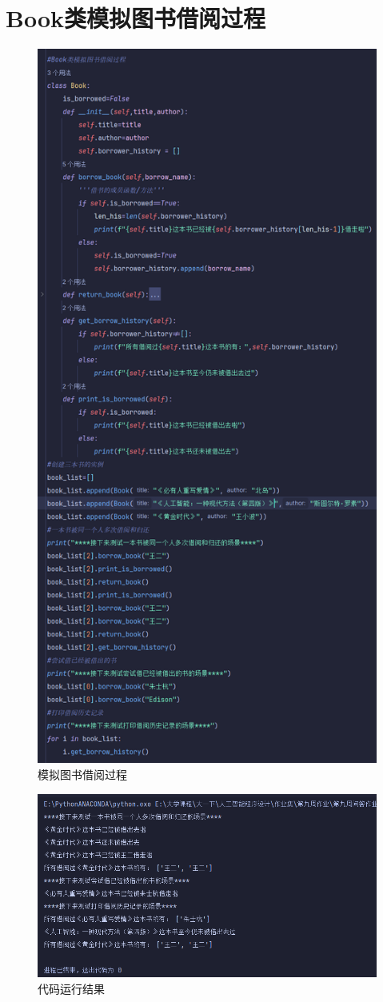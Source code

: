 \documentclass[10pt]{article}
\begin{document}
\section{Book类模拟图书借阅过程}
\begin{figure}[H]
	\centering
	\includegraphics[scale=0.5]{图书馆}
	\caption{模拟图书借阅过程}
\end{figure}
\begin{figure}[H]
	\centering
	\includegraphics[scale=0.8]{运行结果}
	\caption{代码运行结果}
\end{figure}
\end{document}
